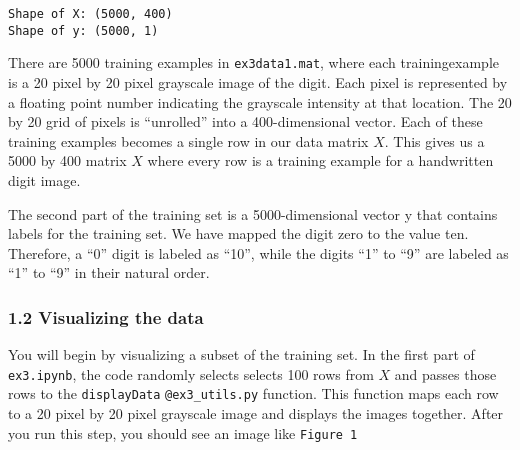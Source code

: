 \documentclass[11pt]{article}
\begin{document}
    \begin{Verbatim}[commandchars=\\\{\}]
Shape of X: (5000, 400)
Shape of y: (5000, 1)

    \end{Verbatim}

    There are 5000 training examples in \texttt{ex3data1.mat}, where each
trainingexample is a 20 pixel by 20 pixel grayscale image of the digit.
Each pixel is represented by a floating point number indicating the
grayscale intensity at that location. The 20 by 20 grid of pixels is
``unrolled'' into a 400-dimensional vector. Each of these training
examples becomes a single row in our data matrix \(X\). This gives us a
5000 by 400 matrix \(X\) where every row is a training example for a
handwritten digit image.

The second part of the training set is a 5000-dimensional vector y that
contains labels for the training set. We have mapped the digit zero to
the value ten. Therefore, a ``0'' digit is labeled as ``10'', while the
digits ``1'' to ``9'' are labeled as ``1'' to ``9'' in their natural
order.

\subsubsection{1.2 Visualizing the data}\label{visualizing-the-data}

You will begin by visualizing a subset of the training set. In the first
part of \texttt{ex3.ipynb}, the code randomly selects selects 100 rows
from \(X\) and passes those rows to the \texttt{displayData}
\texttt{@ex3\_utils.py} function. This function maps each row to a 20
pixel by 20 pixel grayscale image and displays the images together.
After you run this step, you should see an image like \texttt{Figure\ 1}
\end{document}

